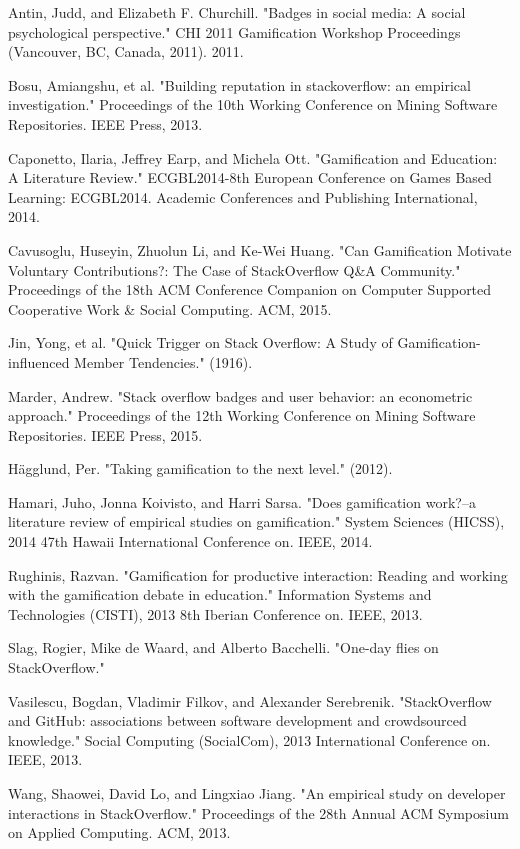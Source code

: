 \documentclass{sigchi}
\begin{document}
\begin{thebibliography}{9}

Antin, Judd, and Elizabeth F. Churchill. "Badges in social media: A social psychological perspective." CHI 2011 Gamification Workshop Proceedings (Vancouver, BC, Canada, 2011). 2011.

Bosu, Amiangshu, et al. "Building reputation in stackoverflow: an empirical investigation." Proceedings of the 10th Working Conference on Mining Software Repositories. IEEE Press, 2013.

Caponetto, Ilaria, Jeffrey Earp, and Michela Ott. "Gamification and Education: A Literature Review." ECGBL2014-8th European Conference on Games Based Learning: ECGBL2014. Academic Conferences and Publishing International, 2014.

Cavusoglu, Huseyin, Zhuolun Li, and Ke-Wei Huang. "Can Gamification Motivate Voluntary Contributions?: The Case of StackOverflow Q\&A Community." Proceedings of the 18th ACM Conference Companion on Computer Supported Cooperative Work \& Social Computing. ACM, 2015.

Jin, Yong, et al. "Quick Trigger on Stack Overflow: A Study of Gamification-influenced Member Tendencies." (1916).

Marder, Andrew. "Stack overflow badges and user behavior: an econometric approach." Proceedings of the 12th Working Conference on Mining Software Repositories. IEEE Press, 2015.

Hägglund, Per. "Taking gamification to the next level." (2012).

Hamari, Juho, Jonna Koivisto, and Harri Sarsa. "Does gamification work?--a literature review of empirical studies on gamification." System Sciences (HICSS), 2014 47th Hawaii International Conference on. IEEE, 2014.

Rughinis, Razvan. "Gamification for productive interaction: Reading and working with the gamification debate in education." Information Systems and Technologies (CISTI), 2013 8th Iberian Conference on. IEEE, 2013.

Slag, Rogier, Mike de Waard, and Alberto Bacchelli. "One-day flies on StackOverflow."

Vasilescu, Bogdan, Vladimir Filkov, and Alexander Serebrenik. "StackOverflow and GitHub: associations between software development and crowdsourced knowledge." Social Computing (SocialCom), 2013 International Conference on. IEEE, 2013.

Wang, Shaowei, David Lo, and Lingxiao Jiang. "An empirical study on developer interactions in StackOverflow." Proceedings of the 28th Annual ACM Symposium on Applied Computing. ACM, 2013.


\end{thebibliography}
\end{document}
